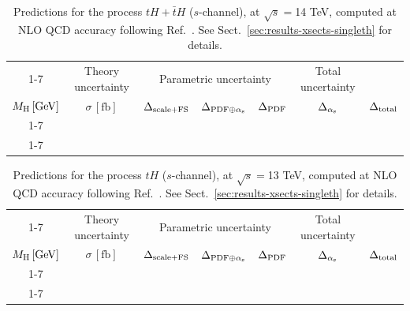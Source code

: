 \begin{table}[ht!]
\caption{\label{tab:th-s-tot14} Predictions for the process $tH + \bar t H$ ($s$-channel), at $\sqrt{s}=$14 TeV, computed at NLO QCD accuracy following Ref.~\cite{Demartin:2015uha}. See Sect.~\ref{sec:results-xsects-singleth} for details.}
\centering
\scriptsize
{\renewcommand{\arraystretch}{1.4}
\begin{tabular}{| cc | c | ccc | c |}
\cline{1-7}
\multicolumn{2}{|c|}{\(\sqrt{s} = 14\,\mathrm{TeV}\)} &
\multicolumn{1}{|c|}{Theory uncertainty} &
\multicolumn{3}{|c|}{Parametric uncertainty} &
\multicolumn{1}{c|}{Total uncertainty} \\
\(M_\mathrm{H}\,[\mathrm{GeV}]\) & \(\sigma\,[\mathrm{fb}]\) &
\(\Delta_{\rm scale+\textrm{FS}}\) &
\(\Delta_{{\rm PDF}\oplus\alpha_{\mathrm{s}}}\) &
{\color{black!55}\(\Delta_{\rm PDF}\)} & {\color{black!55}\(\Delta_{\alpha_{\mathrm{s}}}\)} &
\(\Delta_{\rm total}\)
\\
\cline{1-7}
 \\
\cline{1-7}
\end{tabular}
}
\end{table}
%
\begin{table}[ht!]
\caption{\label{tab:th-s-top13} Predictions for the process $tH$ ($s$-channel), at $\sqrt{s}=$13 TeV, computed at NLO QCD accuracy following Ref.~\cite{Demartin:2015uha}. See Sect.~\ref{sec:results-xsects-singleth} for details.}
\centering
\scriptsize
{\renewcommand{\arraystretch}{1.4}
\begin{tabular}{| cc | c | ccc | c |}
\cline{1-7}
\multicolumn{2}{|c|}{\(\sqrt{s} = 13\,\mathrm{TeV}\)} &
\multicolumn{1}{|c|}{Theory uncertainty} &
\multicolumn{3}{|c|}{Parametric uncertainty} &
\multicolumn{1}{c|}{Total uncertainty} \\
\(M_\mathrm{H}\,[\mathrm{GeV}]\) & \(\sigma\,[\mathrm{fb}]\) &
\(\Delta_{\rm scale+\textrm{FS}}\) &
\(\Delta_{{\rm PDF}\oplus\alpha_{\mathrm{s}}}\) &
{\color{black!55}\(\Delta_{\rm PDF}\)} & {\color{black!55}\(\Delta_{\alpha_{\mathrm{s}}}\)} &
\(\Delta_{\rm total}\)
\\
\cline{1-7}
 \\
\cline{1-7}
\end{tabular}
}
\end{table}

